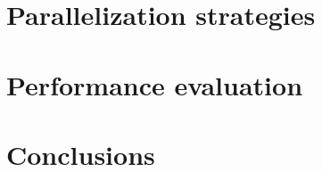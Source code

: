 

\section{Parallelization strategies}%
\label{sec:parallelization_strategies}

\section{Performance evaluation}%
\label{sec:performance_evaluation}

\section{Conclusions}%
\label{sec:conclusions}






